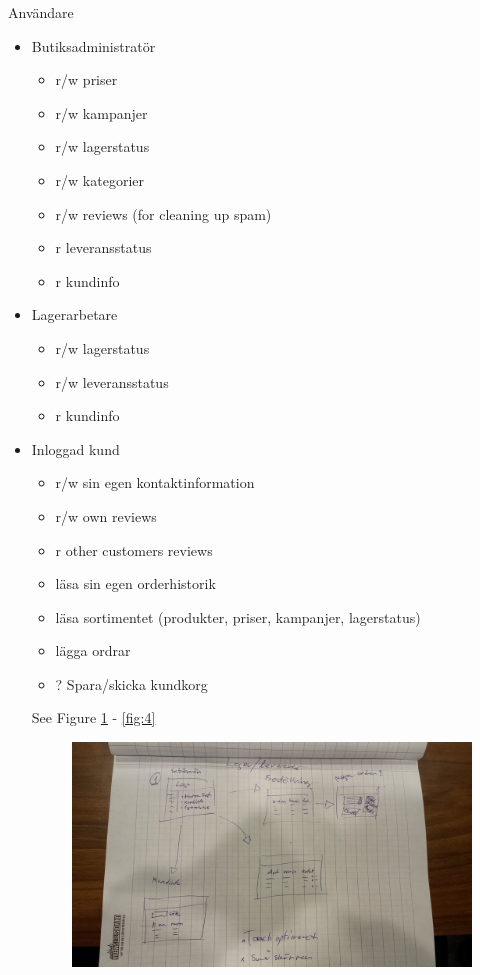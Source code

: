 \documentclass[paper=a4, fontsize=11pt]{report} %
\begin{document}
%

Användare
\begin{itemize}
	\item Butiksadministratör
		\begin{itemize}
			\item r/w priser
			\item r/w kampanjer
			\item r/w lagerstatus
			\item r/w kategorier
			\item r/w reviews (for cleaning up spam)
			\item r leveransstatus
			\item r kundinfo
		\end{itemize}
	\item Lagerarbetare
		\begin{itemize}
			\item r/w lagerstatus
			\item r/w leveransstatus
			\item r kundinfo
		\end{itemize}
	\item Inloggad kund
		\begin{itemize}
			\item r/w sin egen kontaktinformation
			\item r/w own reviews
			\item r other customers reviews
			\item läsa sin egen orderhistorik
			\item läsa sortimentet (produkter, priser, kampanjer, lagerstatus)
			\item lägga ordrar
			\item ? Spara/skicka kundkorg
		\end{itemize}

	See Figure \ref{fig:2} - \ref{fig:4}

	\begin{figure}
		\includegraphics[scale=0.12]{artifacts/Lager.jpeg}
		\caption{}
		\label{fig:2}
	\end{figure}


\end{itemize}
\end{document}
